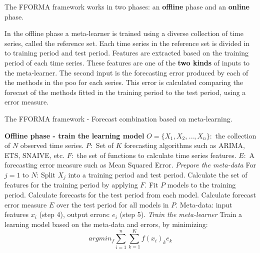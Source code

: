 \documentclass[11pt,a4paper,]{article}
\theoremstyle{definition}
\theoremstyle{definition}
\theoremstyle{definition}
\theoremstyle{remark}
\begin{document}
The FFORMA framework works in two phases: an \textbf{offline} phase and
an \textbf{online} phase.

In the offline phase a meta-learner is trained using a diverse
collection of time series, called the reference set. Each time series in
the reference set is divided in to training period and test period.
Features are extracted based on the training period of each time series.
These features are one of the \textbf{two kinds} of inputs to the
meta-learner. The second input is the forecasting error produced by each
of the methods in the poo for each series. This error is calculated
comparing the forecast of the methods fitted in the training period to
the test period, using a error measure.

\begin{algorithm}[!ht]
  \caption{The FFORMA framework - Forecast combination based on meta-learning. }
  \label{alg:algo-lab}
  \begin{algorithmic}[1]
    \Statex \textbf{Offline phase - train the learning model}
    \Statex {}
    \Statex \hspace{1cm}$O=\{X_1, X_2, \dots,X_n\}:$ the collection of $N$ observed time series.
      \Statex \hspace{1cm}$P:$ Set of $K$ forecasting algorithms such as ARIMA, ETS, SNAIVE, etc.
         \Statex \hspace{1cm}$F:$ the set of functions to calculate time series features.
         \Statex \hspace{1cm}$E:$ A forecasting error measure such as Mean Squared Error.
     \Statex {}
      \Statex \hspace{1cm}
      \Statex {}
    \Statex \textit{Prepare the meta-data}
    \Statex For $j=1$ to $N$:
            \State Split $X_j$ into a training period and test period.
            \State Calculate the set of features for the training period by applying $F$.
            \State Fit $P$ models to the training period.
            \State Calculate forecasts for the test period from each model.
            \State Calculate forecast error measure $E$ over the test period for all models in $P$.
            \State Meta-data: input features $x_i$ (step 4), output errors: $e_i$ (step 5).
     \Statex
    \Statex \textit{Train the meta-learner}
            \State Train a learning model based on the meta-data and errors, by minimizing:
            $$ argmin_f \sum_{i=1}^n \sum_{k=1}^K f(x_i)_k e_k  $$

\end{algorithmic}
\end{algorithm}
\end{document}

